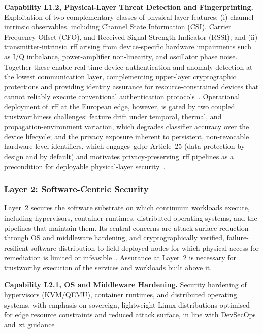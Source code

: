 \documentclass{ieeeaccess}
\begin{document}
\textbf{Capability L1.2, Physical-Layer Threat Detection and Fingerprinting.} Exploitation of two complementary classes of physical-layer features: (i) channel-intrinsic observables, including Channel State Information (CSI), Carrier Frequency Offset (CFO), and Received Signal Strength Indicator (RSSI); and (ii) transmitter-intrinsic~\gls{rff} arising from device-specific hardware impairments such as I/Q imbalance, power-amplifier non-linearity, and oscillator phase noise. Together these enable real-time device authentication and anomaly detection at the lowest communication layer, complementing upper-layer cryptographic protections and providing identity assurance for resource-constrained devices that cannot reliably execute conventional authentication protocols~\cite{alwarafy2021,ranaweera2021}. Operational deployment of~\gls{rff} at the European edge, however, is gated by two coupled trustworthiness challenges: feature drift under temporal, thermal, and propagation-environment variation, which degrades classifier accuracy over the device lifecycle; and the privacy exposure inherent to persistent, non-revocable hardware-level identifiers, which engages~\gls{gdpr} Article~25 (data protection by design and by default) and motivates privacy-preserving~\gls{rff} pipelines as a precondition for deployable physical-layer security~\cite{harizaj2026dual}.

\subsubsection{Layer 2: Software-Centric Security}
\label{sec:L2}

Layer~2 secures the software substrate on which continuum workloads execute, including hypervisors, container runtimes, distributed operating systems, and the pipelines that maintain them. Its central concerns are attack-surface reduction through OS and middleware hardening, and cryptographically verified, failure-resilient software distribution to field-deployed nodes for which physical access for remediation is limited or infeasible~\cite{ietfrfc9019,uptanestd}. Assurance at Layer~2 is necessary for trustworthy execution of the services and workloads built above it.

\textbf{Capability L2.1, OS and Middleware Hardening.} Security hardening of hypervisors (KVM/QEMU), container runtimes, and distributed operating systems, with emphasis on sovereign, lightweight Linux distributions optimised for edge resource constraints and reduced attack surface, in line with DevSecOps and~\gls{zt} guidance~\cite{chandramouli2022devsecops,rose2020zta}.
\end{document}
